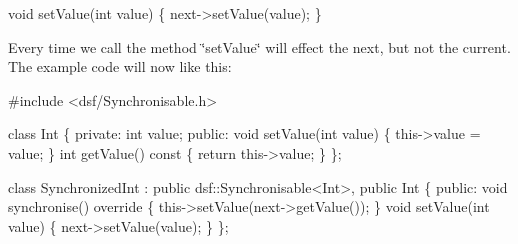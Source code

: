 \begin{DoxyCode}
\textcolor{keywordtype}{void} setValue(\textcolor{keywordtype}{int} value)
\{
    next->setValue(value);
\}
\end{DoxyCode}
 Every time we call the method \char`\"{}set\+Value\char`\"{} will effect the next, but not the current. The example code will now like this\+: 
\begin{DoxyCodeInclude}
\textcolor{preprocessor}{#include <dsf/Synchronisable.h>}

\textcolor{keyword}{class }Int
\{
\textcolor{keyword}{private}:
    \textcolor{keywordtype}{int} value;
\textcolor{keyword}{public}:
    \textcolor{keywordtype}{void} setValue(\textcolor{keywordtype}{int} value)
    \{
        this->value = value;
    \}
    \textcolor{keywordtype}{int} getValue()\textcolor{keyword}{ const}
\textcolor{keyword}{    }\{
        \textcolor{keywordflow}{return} this->value;
    \}
\};

\textcolor{keyword}{class }SynchronizedInt : \textcolor{keyword}{public} dsf::Synchronisable<Int>, \textcolor{keyword}{public} Int
\{
\textcolor{keyword}{public}:
    \textcolor{keywordtype}{void} synchronise()\textcolor{keyword}{ override}
\textcolor{keyword}{    }\{
        this->setValue(next->getValue());
    \}
    \textcolor{keywordtype}{void} setValue(\textcolor{keywordtype}{int} value)
    \{
        next->setValue(value);
    \}
\};
\end{DoxyCodeInclude}
 